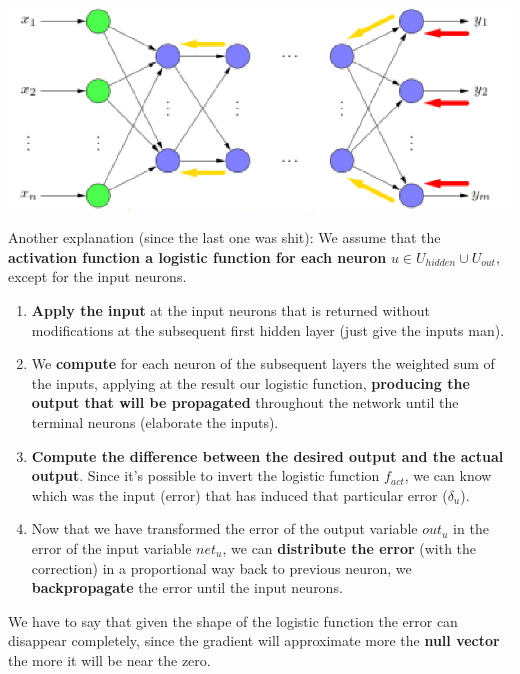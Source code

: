 \begin{center}
	\includegraphics[width=0.9\columnwidth]{img/NN/backprop1}
\end{center}

\newpage

Another explanation (since the last one was shit): We assume that the \textbf{activation function a logistic function for each neuron} $u \in U_{hidden} \cup U_{out}$, except for the input neurons.
\begin{enumerate}
	\item \textbf{Apply the input} at the input neurons that is returned without modifications at the subsequent first hidden layer (just give the inputs man). \\
	
	\item We \textbf{compute} for each neuron of the subsequent layers the weighted sum of the inputs, applying at the result our logistic function, \textbf{producing the output that will be propagated} throughout the network until the terminal neurons (elaborate the inputs).\\
	
	\item \textbf{Compute the difference between the desired output and the actual output}. Since it's possible to invert the logistic function $f_{act}$, we can know which was the input (error) that has induced that particular error ($\delta_u$).\\
	
	\item Now that we have transformed the error of the output variable $out_u$ in the error of the input variable $net_u$, we can \textbf{distribute the error} (with the correction) in a proportional way back to previous neuron, we \textbf{backpropagate} the error until the input neurons.\\
\end{enumerate}

We have to say that given the shape of the logistic function the error can disappear completely, since the gradient will approximate more the \textbf{null vector} the more it will be near the zero. \\

